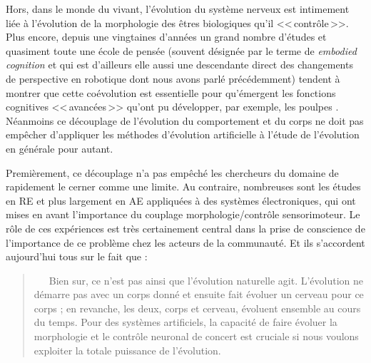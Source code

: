 Hors, dans le monde du vivant, l'évolution du système nerveux est intimement liée à l'évolution de la morphologie des êtres biologiques qu'il <<\,contrôle\,>>. Plus encore, depuis une vingtaines d'années un grand nombre d'études et quasiment toute une école de pensée (souvent désignée par le terme de \emph{embodied cognition} et qui est d'ailleurs elle aussi une descendante direct des changements de perspective en robotique dont nous avons parlé précédemment) tendent à montrer que cette coévolution est essentielle pour qu'émergent les fonctions cognitives <<\,avancées\,>> qu'ont pu développer, par exemple, les poulpes \citep{pfeifer2006howthebodyshapesthewaywethink}. Néanmoins ce découplage de l'évolution du comportement et du corps ne doit pas empêcher d'appliquer les méthodes d'évolution artificielle à l'étude de l'évolution en générale pour autant.

Premièrement, ce découplage n'a pas empêché les chercheurs du domaine de rapidement le cerner comme une limite. Au contraire, nombreuses sont les études en RE et plus largement en AE appliquées à des systèmes électroniques, qui ont mises en avant l'importance du couplage morphologie/contrôle sensorimoteur. Le rôle de ces expériences est très certainement central dans la prise de conscience de l'importance de ce problème chez les acteurs de la communauté. Et ils s'accordent aujourd'hui tous sur le fait que :
\begin{quotation}
   Bien sur, ce n'est pas ainsi que l'évolution naturelle agit. L'évolution ne démarre pas avec un corps donné et ensuite fait évoluer un cerveau pour ce corps ; en revanche, les deux, corps et cerveau, évoluent ensemble au cours du temps. Pour des systèmes artificiels, la capacité de faire évoluer la morphologie et le contrôle neuronal de concert est cruciale si nous voulons exploiter la totale puissance de l'évolution.
   \\\citep[p. 193]{pfeifer2006howthebodyshapesthewaywethink}
\end{quotation}

